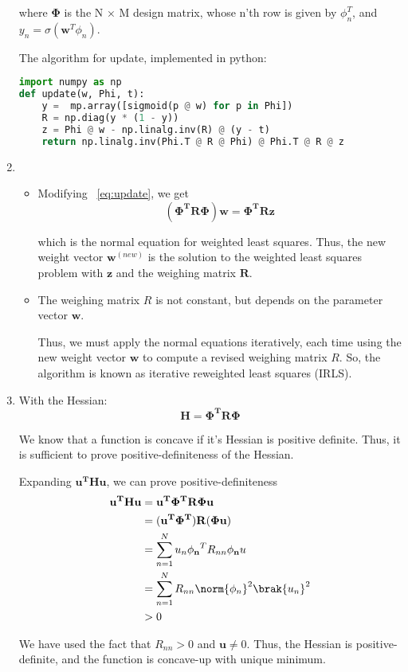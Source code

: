 \documentclass{amsart}
\begin{document}
\begin{enumerate}[label=\textbf{(\Roman*)}]
        where \(\mathbf{\Phi}\) is the N × M design matrix, whose n'th row is given by \(\phi_n^T\), and \(y_n = \sigma(\mathbf{w}^T \phi_n)\).

        The algorithm for update, implemented in python:

        \begin{lstlisting}[language=Python]
import numpy as np
def update(w, Phi, t):
    y =  mp.array([sigmoid(p @ w) for p in Phi])
    R = np.diag(y * (1 - y))
    z = Phi @ w - np.linalg.inv(R) @ (y - t)
    return np.linalg.inv(Phi.T @ R @ Phi) @ Phi.T @ R @ z
        \end{lstlisting}

        \item 
        \begin{itemize}
            \item Modifying ~\ref{eq:update}, we get 
            \[(\mathbf{\Phi^T R \Phi}) \mathbf{w} = \mathbf{\Phi^T R z}\]
    
            which is the normal equation for weighted least squares. Thus, the new weight vector \(\mathbf{w}^{(new)}\) is the solution to the weighted least squares problem with \(\mathbf{z}\) and the weighing matrix \(\mathbf{R}\).
            
            \item The weighing matrix \(R\) is not constant, but depends on the parameter vector \(\mathbf{w}\).
            
            Thus, we must apply the normal equations iteratively, each time using the new weight vector \(\mathbf{w}\) to compute a revised weighing matrix \(R\). So, the algorithm is known as iterative reweighted least squares (IRLS).
        \end{itemize}
        \item 
        With the Hessian: \[\mathbf{H} = \mathbf{\Phi^T R \Phi}\]

        We know that a function is concave if it's Hessian is positive definite. Thus, it is sufficient to prove positive-definiteness of the Hessian.

        Expanding \( \mathbf{u^T H u} \), we can prove positive-definiteness \begin{align}
            \begin{split}
                \mathbf{u^T H u} &= \mathbf{u^T \Phi^T R \Phi u} \\
                &= (\mathbf{u^T \Phi^T}) \mathbf{R} (\mathbf{\Phi u}) \\
                &= \sum_{n = 1}^{N} u_n \mathbf{\phi_n}^T R_{nn} \mathbf{\phi_n} u \\
                &= \sum_{n = 1}^{N} R_{nn} \norm{\phi_n}^2 \brak{u_n}^2 \\
                &> 0
            \end{split}
        \end{align}

        We have used the fact that \(R_{nn} > 0\) and \(\mathbf{u} \neq 0\). Thus, the Hessian is positive-definite, and the function is concave-up with unique minimum.


    \end{enumerate}
\end{document}
